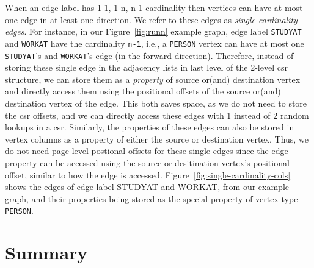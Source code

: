 When an edge label has 1-1, 1-n, n-1 cardinality then vertices can have at most one edge in at least one direction. We refer to these edges as {\em single cardinality edges}. For instance, in our Figure~\ref{fig:runn} example graph, edge label \texttt{STUDYAT} and \texttt{WORKAT} have the cardinality \texttt{n-1}, i.e., a \texttt{PERSON} vertex can have at most one \texttt{STUDYAT}'s and \texttt{WORKAT}'s edge (in the forward direction). Therefore, instead of storing these single edge in the adjacency lists in last level of the 2-level \gls{csr} structure, we can store them as a \emph{property} of source or(and) destination vertex and directly access them using the positional offsets of the source or(and) destination vertex of the edge. This both saves space, as we do not need to store the \gls{csr} offsets, and we can directly access these edges with 1 instead of 2 random lookups in a \gls{csr}. Similarly, the properties of these edges can also be stored in vertex columns as a property of either the source or destination vertex. Thus, we do not need page-level postional offsets for these single edges since the edge property can be accessed using the source or desitination vertex's positional offset, similar to how the edge is accessed. Figure~\ref{fig:single-cardinality-cols} shows the edges of edge label STUDYAT and WORKAT, from our example graph, and their properties being stored as the special property of vertex type \texttt{PERSON}.



\section{Summary}
\label{summary}

